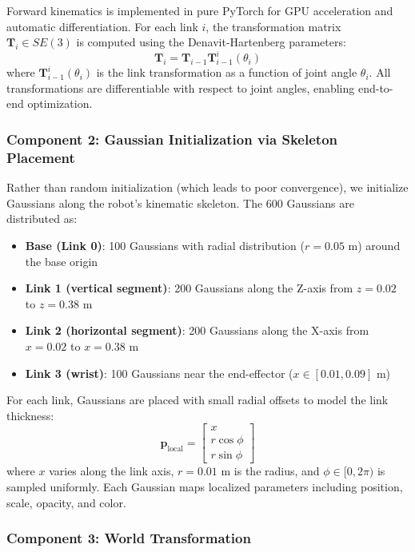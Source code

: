 \documentclass[12pt,a4paper,oneside]{report}
\begin{document}
Forward kinematics is implemented in pure PyTorch for GPU acceleration and automatic differentiation. For each link $i$, the transformation matrix $\mathbf{T}_i \in SE(3)$ is computed using the Denavit-Hartenberg parameters:
\begin{equation}
\mathbf{T}_i = \mathbf{T}_{i-1} \mathbf{T}_{i-1}^{i}(\theta_i)
\end{equation}
where $\mathbf{T}_{i-1}^{i}(\theta_i)$ is the link transformation as a function of joint angle $\theta_i$. All transformations are differentiable with respect to joint angles, enabling end-to-end optimization.

\subsubsection{Component 2: Gaussian Initialization via Skeleton Placement}

Rather than random initialization (which leads to poor convergence), we initialize Gaussians along the robot's kinematic skeleton. The 600 Gaussians are distributed as:
\begin{itemize}
    \item \textbf{Base (Link 0)}: 100 Gaussians with radial distribution ($r = 0.05$ m) around the base origin
    \item \textbf{Link 1 (vertical segment)}: 200 Gaussians along the Z-axis from $z=0.02$ to $z=0.38$ m
    \item \textbf{Link 2 (horizontal segment)}: 200 Gaussians along the X-axis from $x=0.02$ to $x=0.38$ m
    \item \textbf{Link 3 (wrist)}: 100 Gaussians near the end-effector ($x \in [0.01, 0.09]$ m)
\end{itemize}
For each link, Gaussians are placed with small radial offsets to model the link thickness:
\begin{equation}
\mathbf{p}_{\text{local}} = \begin{bmatrix} x \\ r \cos\phi \\ r \sin\phi \end{bmatrix}
\end{equation}
where $x$ varies along the link axis, $r = 0.01$ m is the radius, and $\phi \in [0, 2\pi)$ is sampled uniformly. Each Gaussian maps localized parameters including position, scale, opacity, and color.

\subsubsection{Component 3: World Transformation}
\end{document}

